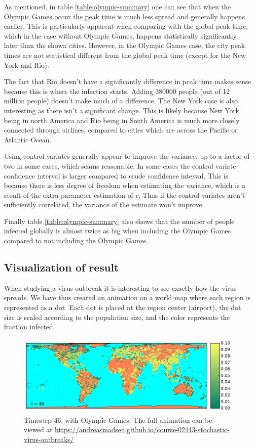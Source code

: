 As mentioned, in table \ref{table:olympic-summary} one can see that when the Olympic Games occur the peak time is much less spread and generally happens earlier. This is particularly apparent when comparing with the global peak time, which in the case without Olympic Games, happens statistically significantly later than the shown cities. However, in the Olympic Games case, the city peak times are not statistical different from the global peak time (except for the New York and Rio).

The fact that Rio doesn't have a significantly difference in peak time makes sense because this is where the infection starts. Adding 380000 people (out of 12 million people) doesn't make much of a difference. The New York case is also interesting as there isn't a significant change. This is likely because New York being in north America and Rio being in South America is much more closely connected through airlines, compared to cities which are across the Pacific or Atlantic Ocean.

Using control variates generally appear to improve the variance, up to a factor of two in some cases, which seams reasonable. In some cases the control variate confidence interval is larger compared to crude confidence interval. This is because there is less degree of freedom when estimating the variance, which is a result of the extra parameter estimation of $c$. Thus if the control variates aren't sufficiently correlated, the variance of the estimate won't improve.

Finally table \ref{table:olympic-summary} also shows that the number of people infected globally is almost twice as big when including the Olympic Games compared to not including the Olympic Games.

\subsection{Visualization of result}
When studying a virus outbreak it is interesting to see exactly how the virus spreads. We have thus created an animation on a world map where each region is represented as a dot. Each dot is placed at the region center (airport), the dot size is scaled according to the population size, and the color represents the fraction infected.

\begin{figure}[H]
	\centering
	\includegraphics[width=1.0 \linewidth]{plots/gifs/frames/rio-46}
	\caption{Timestep 46, with Olympic Games. The full animation can be viewed at
		\url{https://andreasmadsen.github.io/course-02443-stochastic-virus-outbreaks/}}
	\label{fig:rio-46}
\end{figure}

